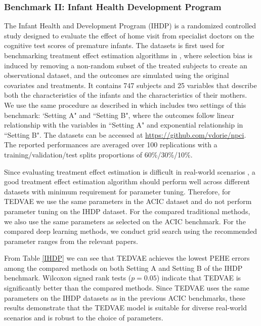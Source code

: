 \documentclass[letterpaper]{article} %
\begin{document}
\subsubsection{Benchmark II: Infant Health Development Program}
The Infant Health and Development Program (IHDP) is a randomized controlled study designed to evaluate the effect of home visit from specialist doctors on the cognitive test scores of premature infants.
The datasets is first used for benchmarking treatment effect estimation algorithms in \cite{Hill2011}, where selection bias is induced by removing a non-random subset of the treated subjects to create an observational dataset, and the outcomes are simulated using the original covariates and treatments.
It contains 747 subjects and 25 variables that describe both the characteristics of the infants and the characteristics of their mothers.
We use the same procedure as described in \cite{Hill2011} which includes two settings of this benchmark: `Setting A" and ``Setting B", where the outcomes follow linear relationship with the variables in ``Setting A" and exponential relationship in ``Setting B". The datasets can be accessed at \url{https://github.com/vdorie/npci}.
The reported performances are averaged over 100 replications with a training/validation/test splits proportions of 60\%/30\%/10\%.

Since evaluating treatment effect estimation is difficult in real-world scenarios \cite{Alaa2019}, a good treatment effect estimation algorithm should perform well across different datasets with minimum requirement for parameter tuning.
Therefore, for TEDVAE we use the same parameters in the ACIC dataset and do not perform parameter tuning on the IHDP dataset.
For the compared traditional methods, we also use the same parameters as selected on the ACIC benchmark. For the compared deep learning methods, we conduct grid search using the recommended parameter ranges from the relevant papers.

From Table \ref{IHDP} we can see that TEDVAE achieves the lowest PEHE errors among the compared methods on both Setting A and Setting B of the IHDP benchmark. Wilcoxon signed rank tests ($p=0.05$) indicate that TEDVAE is significantly better than the compared methods.
Since TEDVAE uses the same parameters on the IHDP datasets as in the previous ACIC benchmarks,  these results demonstrate that the TEDVAE model is suitable for diverse real-world scenarios and is robust to the choice of parameters.
\end{document}
